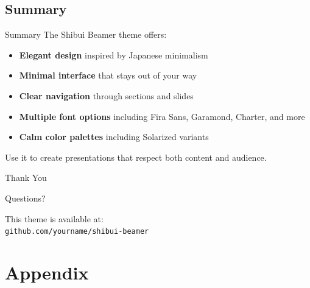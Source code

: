 \documentclass[aspectratio=169]{beamer}
\begin{document}

\subsection{Summary}

\begin{frame}{Summary}
  The Shibui Beamer theme offers:

  \begin{itemize}
    \item \textbf{Elegant design} inspired by Japanese minimalism
    \item \textbf{Minimal interface} that stays out of your way
    \item \textbf{Clear navigation} through sections and slides
    \item \textbf{Multiple font options} including Fira Sans, Garamond, Charter, and more
    \item \textbf{Calm color palettes} including Solarized variants
  \end{itemize}

  \vspace{1em}

  Use it to create presentations that respect both content and audience.
\end{frame}

\begin{frame}{Thank You}
  \centering
  \vspace{2em}

  {\Large Questions?}

  \vspace{2em}

  \textcolor{shibuidarkgray}{%
    This theme is available at: \\
    \texttt{github.com/yourname/shibui-beamer}
  }
\end{frame}


\appendix

\section{Appendix}
\end{document}

